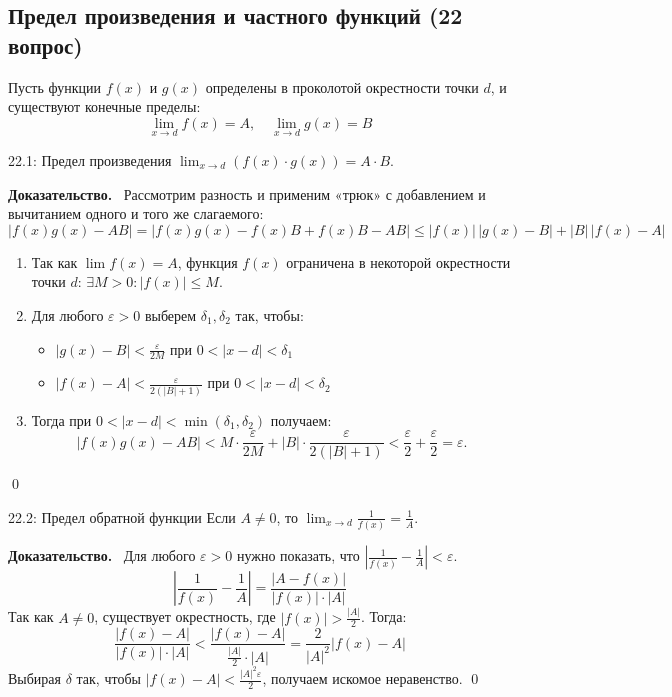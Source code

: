 \documentclass[a4paper,12pt]{article}
\newcommand{\myproof}{\textbf{Доказательство.}\ }
\begin{document}
	
	
	
	\vspace{1cm}
	\subsection{Предел произведения и частного функций (22 вопрос)}
	
	Пусть функции $f(x)$ и $g(x)$ определены в проколотой окрестности точки $d$, и существуют конечные пределы:
	\[ \lim_{x \to d} f(x) = A, \quad \lim_{x \to d} g(x) = B \]
	
	\begin{theorembox}{22.1: Предел произведения}
		$\lim_{x \to d} (f(x) \cdot g(x)) = A \cdot B$.
	\end{theorembox}
	
	\vspace{0.5cm}
	\myproof
	Рассмотрим разность и применим «трюк» с добавлением и вычитанием одного и того же слагаемого:
	\[ |f(x)g(x) - AB| = |f(x)g(x) - f(x)B + f(x)B - AB| \le |f(x)|\,|g(x) - B| + |B|\,|f(x) - A| \]
	\begin{enumerate}
		\item Так как $\lim f(x) = A$, функция $f(x)$ ограничена в некоторой окрестности точки $d$: $\exists M > 0 \colon |f(x)| \le M$.
		\item Для любого $\varepsilon > 0$ выберем $\delta_1, \delta_2$ так, чтобы:
		\begin{itemize}
			\item $|g(x) - B| < \frac{\varepsilon}{2M}$ при $0 < |x - d| < \delta_1$
			\item $|f(x) - A| < \frac{\varepsilon}{2(|B|+1)}$ при $0 < |x - d| < \delta_2$
		\end{itemize}
		\item Тогда при $0 < |x - d| < \min(\delta_1, \delta_2)$ получаем:
		\[ |f(x)g(x) - AB| < M \cdot \frac{\varepsilon}{2M} + |B| \cdot \frac{\varepsilon}{2(|B|+1)} < \frac{\varepsilon}{2} + \frac{\varepsilon}{2} = \varepsilon. \]
	\end{enumerate} \qed
	
	\begin{theorembox}{22.2: Предел обратной функции}
		Если $A \neq 0$, то $\lim_{x \to d} \frac{1}{f(x)} = \frac{1}{A}$.
	\end{theorembox}
	
	\myproof
	Для любого $\varepsilon > 0$ нужно показать, что $\left| \frac{1}{f(x)} - \frac{1}{A} \right| < \varepsilon$.
	\[ \left| \frac{1}{f(x)} - \frac{1}{A} \right| = \frac{|A - f(x)|}{|f(x)| \cdot |A|} \]
	Так как $A \neq 0$, существует окрестность, где $|f(x)| > \frac{|A|}{2}$. Тогда:
	\[ \frac{|f(x) - A|}{|f(x)| \cdot |A|} < \frac{|f(x) - A|}{\frac{|A|}{2} \cdot |A|} = \frac{2}{|A|^2} |f(x) - A| \]
	Выбирая $\delta$ так, чтобы $|f(x) - A| < \frac{|A|^2 \varepsilon}{2}$, получаем искомое неравенство. \qed
	
\end{document}
